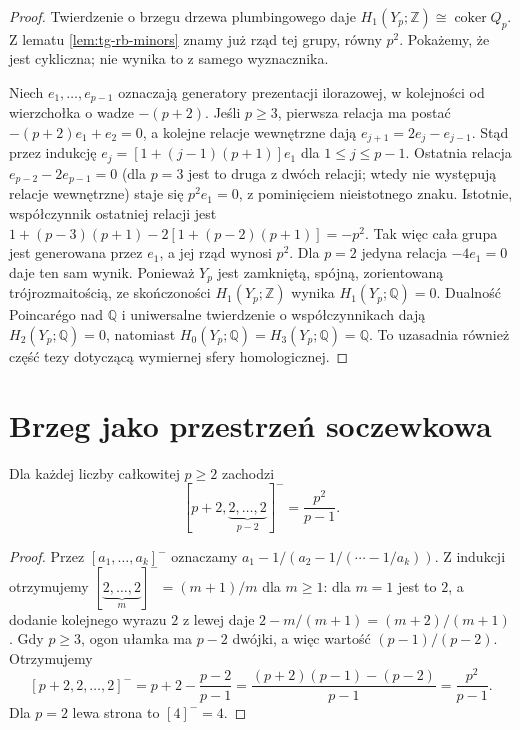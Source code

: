 \begin{proof}
Twierdzenie o brzegu drzewa plumbingowego daje
$H_1(Y_p;\mathbb Z)\cong\operatorname{coker}Q_p$.
Z lematu \ref{lem:tg-rb-minors} znamy już rząd
tej grupy, równy $p^2$. Pokażemy, że jest cykliczna;
nie wynika to z samego wyznacznika.

Niech $e_1,\ldots,e_{p-1}$ oznaczają generatory
prezentacji ilorazowej, w kolejności od wierzchołka
o wadze $-(p+2)$. Jeśli $p\geq3$, pierwsza relacja
ma postać $-(p+2)e_1+e_2=0$, a kolejne relacje
wewnętrzne dają $e_{j+1}=2e_j-e_{j-1}$.
Stąd przez indukcję
$e_j=[1+(j-1)(p+1)]e_1$ dla $1\leq j\leq p-1$.
Ostatnia relacja $e_{p-2}-2e_{p-1}=0$
(dla $p=3$ jest to druga z dwóch relacji;
wtedy nie występują relacje wewnętrzne) staje się
$p^2e_1=0$, z pominięciem nieistotnego znaku.
Istotnie, współczynnik ostatniej relacji jest
$1+(p-3)(p+1)-2[1+(p-2)(p+1)]=-p^2$.
Tak więc cała grupa jest generowana przez $e_1$,
a jej rząd wynosi $p^2$. Dla $p=2$ jedyna relacja
$-4e_1=0$ daje ten sam wynik.
Ponieważ $Y_p$ jest zamkniętą, spójną,
zorientowaną trójrozmaitością, ze skończoności
$H_1(Y_p;\mathbb Z)$ wynika $H_1(Y_p;\mathbb Q)=0$.
Dualność Poincarégo nad $\mathbb Q$ i uniwersalne
twierdzenie o współczynnikach dają
$H_2(Y_p;\mathbb Q)=0$, natomiast
$H_0(Y_p;\mathbb Q)=H_3(Y_p;\mathbb Q)=\mathbb Q$.
To uzasadnia również część tezy dotyczącą
wymiernej sfery homologicznej.
\end{proof}

\section{Brzeg jako przestrzeń soczewkowa}
\label{sec:tg-rb-lens}

\begin{lemat}
\label{lem:tg-rb-cfrac}
Dla każdej liczby całkowitej $p\geq2$ zachodzi
\[
[p+2,\underbrace{2,\ldots,2}_{p-2}]^-
=\frac{p^2}{p-1}.
\]
\end{lemat}

\begin{proof}
Przez $[a_1,\ldots,a_k]^-$ oznaczamy
$a_1-1/(a_2-1/(\cdots-1/a_k))$.
Z indukcji otrzymujemy $[\underbrace{2,\ldots,2}_{m}]^-
=(m+1)/m$ dla $m\geq1$: dla $m=1$ jest to $2$,
a dodanie kolejnego wyrazu $2$ z lewej daje
$2-m/(m+1)=(m+2)/(m+1)$.
Gdy $p\geq3$, ogon ułamka ma $p-2$ dwójki,
a więc wartość $(p-1)/(p-2)$. Otrzymujemy
\[
[p+2,2,\ldots,2]^-
=p+2-\frac{p-2}{p-1}
=\frac{(p+2)(p-1)-(p-2)}{p-1}
=\frac{p^2}{p-1}.
\]
Dla $p=2$ lewa strona to $[4]^-=4$.
\end{proof}


